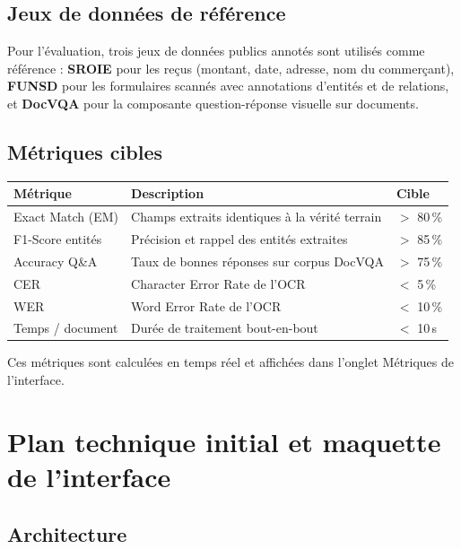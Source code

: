 \documentclass[11pt,a4paper]{article}
\begin{document}
\subsection{Jeux de données de référence}

Pour l'évaluation, trois jeux de données publics annotés sont utilisés comme référence : \textbf{SROIE} pour les reçus (montant, date, adresse, nom du commerçant), \textbf{FUNSD} pour les formulaires scannés avec annotations d'entités et de relations, et \textbf{DocVQA} pour la composante question-réponse visuelle sur documents.

\subsection{Métriques cibles}

\begin{center}
\begin{tabular}{lll}
\toprule
\textbf{Métrique} & \textbf{Description} & \textbf{Cible} \\
\midrule
Exact Match (EM) & Champs extraits identiques à la vérité terrain & $>$ 80\,\% \\
F1-Score entités & Précision et rappel des entités extraites & $>$ 85\,\% \\
Accuracy Q\&A & Taux de bonnes réponses sur corpus DocVQA & $>$ 75\,\% \\
CER & Character Error Rate de l'OCR & $<$ 5\,\% \\
WER & Word Error Rate de l'OCR & $<$ 10\,\% \\
Temps / document & Durée de traitement bout-en-bout & $<$ 10\,s \\
\bottomrule
\end{tabular}
\end{center}

Ces métriques sont calculées en temps réel et affichées dans l'onglet Métriques de l'interface.

\section{Plan technique initial et maquette de l'interface}

\subsection{Architecture}
\end{document}
